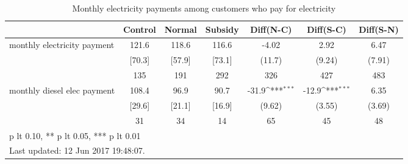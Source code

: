 \begin{table}[htbp]\centering
\def\sym#1{\ifmmode^{#1}\else\(^{#1}\)\fi}
\caption{Monthly electricity payments among customers who pay for electricity \label{tab:"balance"}}
\begin{tabular*}{1\hsize}{@{\hskip\tabcolsep\extracolsep\fill}l*{1}{cccccc}}
\toprule
                                &  Control&   Normal&  Subsidy&Diff(N-C)         &Diff(S-C)         &Diff(S-N)         \\
\midrule
monthly electricity payment     &    121.6&    118.6&    116.6&    -4.02         &     2.92         &     6.47         \\
                                &   [70.3]&   [57.9]&   [73.1]&   (11.7)         &   (9.24)         &   (7.91)         \\
                                &      135&      191&      292&      326         &      427         &      483         \\
monthly diesel elec payment     &    108.4&     96.9&     90.7&    -31.9\sym{***}&    -12.9\sym{***}&     6.35         \\
                                &   [29.6]&   [21.1]&   [16.9]&   (9.62)         &   (3.55)         &   (3.69)         \\
                                &       31&       34&       14&       65         &       45         &       48         \\
\bottomrule
\multicolumn{7}{l}{\footnotesize * p lt 0.10, ** p lt 0.05, *** p lt 0.01}\\
\multicolumn{7}{l}{\footnotesize Last updated: 12 Jun 2017 19:48:07.}\\
\end{tabular*}
\end{table}
